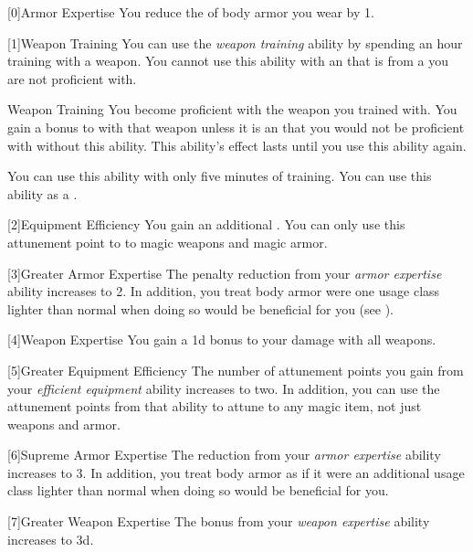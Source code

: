         [0]{Armor Expertise} You reduce the  of body armor you wear by 1.

        [1]{Weapon Training} You can use the \textit{weapon training} ability by spending an hour training with a weapon.
        You cannot use this ability with an  that is from a  you are not proficient with.
        \begin{freeability}{Weapon Training}
            You become proficient with the weapon you trained with.
            You gain a  bonus to  with that weapon unless it is an  that you would not be proficient with without this ability.
            This ability's effect lasts until you use this ability again.

            \rankline
             You can use this ability with only five minutes of training.
             You can use this ability as a .
        \end{freeability}

        [2]{Equipment Efficiency} You gain an additional .
        You can only use this attunement point to  to magic weapons and magic armor.

        [3]{Greater Armor Expertise}
        The penalty reduction from your \textit{armor expertise} ability increases to 2.
        In addition, you treat body armor were one usage class lighter than normal when doing so would be beneficial for you (see ).

        [4]{Weapon Expertise} You gain a \plus1d bonus to your damage with all weapons.

        [5]{Greater Equipment Efficiency} The number of attunement points you gain from your \textit{efficient equipment} ability increases to two.
        In addition, you can use the attunement points from that ability to attune to any magic item, not just weapons and armor.

        [6]{Supreme Armor Expertise}
        The  reduction from your \textit{armor expertise} ability increases to 3.
        In addition, you treat body armor as if it were an additional usage class lighter than normal when doing so would be beneficial for you.

        [7]{Greater Weapon Expertise} The bonus from your \textit{weapon expertise} ability increases to \plus3d.

